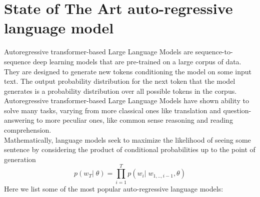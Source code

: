 \section{State of The Art auto-regressive language model}
\label{sec:state_of_the_art_autoregressive_models}

Autoregressive transformer-based Large Language Models are sequence-to-sequence deep learning models that are pre-trained on a large corpus of data. They are designed to generate new tokens conditioning the model on some input text. The output probability distribution for the next token that the model generates is a probability distribution over all possible tokens in the corpus. \\
Autoregressive transformer-based Large Language Models have shown ability to solve many tasks\cite{gpt3}, varying from more classical ones like translation and question-answering to more peculiar ones, like common sense reasoning and reading comprehension. \\
Mathematically, language models seek to maximize the likelihood of seeing some sentence by considering the product of conditional probabilities up to the point of generation
\begin{equation}
    p(w_T|\;\theta) = \prod_{i=1}^{T}p(w_i|\;w_{1,..,i-1}, \theta)
\end{equation}
Here we list some of the most popular auto-regressive language models:
